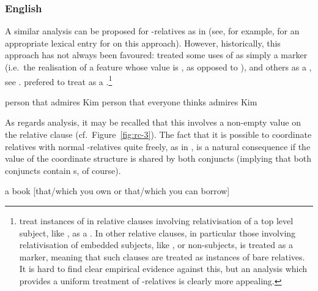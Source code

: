 \documentclass[output=paper,biblatex,babelshorthands,newtxmath,draftmode,colorlinks,citecolor=brown]{langscibook}
\begin{document}
\subsubsection{English}
\label{sec:rc-english}
%
%
\largerpage
\enlargethispage{3pt}
A similar analysis can be proposed for  -relatives as in
 (see, for example, \crossrefchaptert[\page \pageref{fig:UDC:59}]{udc} for an
appropriate lexical entry for  on this approach).  However,
historically, this approach has not always been favoured: \citet{Pollard:Sag:94} treated some uses of
 as simply a marker (i.e.\ the realisation of a  feature whose value
is , as opposed to ), and
others as  a , see . 
\citet[462--464]{Sag:97} prefered to treat  as
a .\footnote{\label{fn:rc-4}\citet[Section~5.2.3]{Pollard:Sag:94} treat instances of 
   in relative clauses involving relativisation of a top level subject, like ,
  as a .  In other relative clauses, in particular those involving
  relativisation of embedded subjects, like 
  , or non-subjects,  is treated as a marker, meaning that such
  clauses are treated as instances of bare relatives. It is hard to find clear empirical
  evidence against this, but an analysis which provides a uniform treatment of 
  -relatives is clearly more appealing.}
\begin{exe}\ex\begin{xlist}\label{x:rc-59}
  \ex\label{x:rc-60} person that \trace{} admires Kim
  \ex\label{x:rc-61} person that everyone thinks \trace{} admires Kim
\end{xlist}\end{exe}
As regards  analysis, it may be recalled that this involves a
non-empty  value on the relative clause (cf.\ Figure~\ref{fig:rc-3}). The fact that it
is possible to coordinate  relatives with normal
-relatives quite freely, as in , is a natural consequence if the
 value of the coordinate structure is shared by both conjuncts (implying that
both conjuncts contain s, of course).
\begin{exe}\ex\label{x:rc-62}
 a book [that/which you own or that/which you can borrow]
\end{exe}
\end{document}
